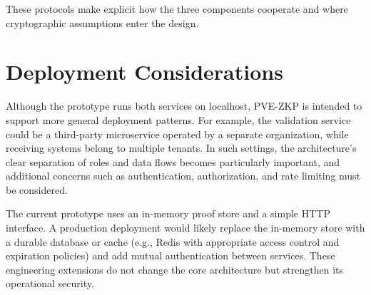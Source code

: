 These protocols make explicit how the three components cooperate and where
cryptographic assumptions enter the design.

\section{Deployment Considerations}

Although the prototype runs both services on localhost, PVE-ZKP is intended to
support more general deployment patterns. For example, the validation service
could be a third-party microservice operated by a separate organization, while
receiving systems belong to multiple tenants. In such settings, the
architecture's clear separation of roles and data flows becomes particularly
important, and additional concerns such as authentication, authorization, and
rate limiting must be considered.

The current prototype uses an in-memory proof store and a simple HTTP
interface. A production deployment would likely replace the in-memory store
with a durable database or cache (e.g., Redis with appropriate access control
and expiration policies) and add mutual authentication between services. These
engineering extensions do not change the core architecture but strengthen its
operational security.
